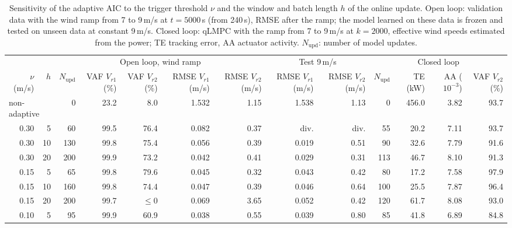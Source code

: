 \begin{table}[htbp]
    \centering
    \caption[Sensitivity of the adaptive AIC to the update settings]{Sensitivity of the adaptive AIC to the trigger threshold $\nu$ and the window and batch length $h$ of the online update. Open loop: validation data with the wind ramp from 7 to 9\,m/s at $t = 5000$\,s (from 240\,s), RMSE after the ramp; the model learned on these data is frozen and tested on unseen data at constant 9\,m/s. Closed loop: qLMPC with the ramp from 7 to 9\,m/s at $k = 2000$, effective wind speeds estimated from the power; TE tracking error, AA actuator activity. $N_\text{upd}$: number of model updates.}
    \label{tab:sensitivityAdaptiveAIC}
    \begin{adjustbox}{max width=\textwidth}
    \begin{tabular}{rr rrrrr rr rrrr}
        \toprule
        & & \multicolumn{5}{c}{Open loop, wind ramp} & \multicolumn{2}{c}{Test 9\,m/s} & \multicolumn{4}{c}{Closed loop} \\
        \cmidrule(lr){3-7} \cmidrule(lr){8-9} \cmidrule(lr){10-13}
        $\nu$ (m/s) & $h$ & $N_\text{upd}$ & VAF $V_{r1}$ (\%) & VAF $V_{r2}$ (\%) & RMSE $V_{r1}$ (m/s) & RMSE $V_{r2}$ (m/s) & RMSE $V_{r1}$ (m/s) & RMSE $V_{r2}$ (m/s) & $N_\text{upd}$ & TE (kW) & AA ($10^{-3}$) & VAF $V_{r2}$ (\%) \\
        \midrule
        \multicolumn{2}{l}{non-adaptive} & 0 & 23.2 & 8.0 & 1.532 & 1.15 & 1.538 & 1.13 & 0 & 456.0 & 3.82 & 93.7 \\ \midrule
        0.30 & 5 & 60 & 99.5 & 76.4 & 0.082 & 0.37 & div. & div. & 55 & 20.2 & 7.11 & 93.7 \\
        0.30 & 10 & 130 & 99.8 & 75.4 & 0.056 & 0.39 & 0.019 & 0.51 & 90 & 32.6 & 7.79 & 91.6 \\
        0.30 & 20 & 200 & 99.9 & 73.2 & 0.042 & 0.41 & 0.029 & 0.31 & 113 & 46.7 & 8.10 & 91.3 \\ \midrule
        0.15 & 5 & 65 & 99.8 & 79.6 & 0.045 & 0.32 & 0.043 & 0.42 & 80 & 17.2 & 7.58 & 97.9 \\
        0.15 & 10 & 160 & 99.8 & 74.4 & 0.047 & 0.39 & 0.046 & 0.64 & 100 & 25.5 & 7.87 & 96.4 \\
        0.15 & 20 & 200 & 99.7 & $\leq 0$ & 0.069 & 3.65 & 0.052 & 0.42 & 120 & 61.7 & 8.08 & 93.0 \\ \midrule
        0.10 & 5 & 95 & 99.9 & 60.9 & 0.038 & 0.55 & 0.039 & 0.80 & 85 & 41.8 & 6.89 & 84.8 \\

\end{tabular}
\end{adjustbox}
\end{table}
